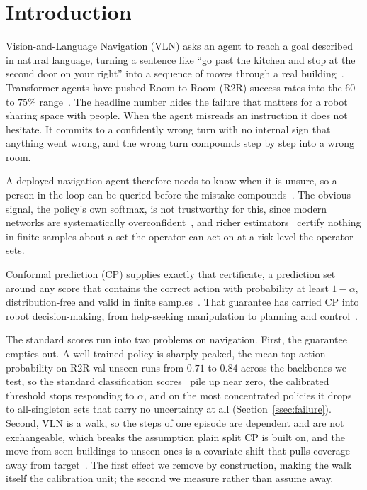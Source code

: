 \section{Introduction}
\label{sec:intro}

Vision-and-Language Navigation (VLN) asks an agent to reach a goal described in
natural language, turning a sentence like ``go past the kitchen and stop at the
second door on your right'' into a sequence of moves through a real
building~\cite{anderson2018r2r}. Transformer agents have pushed Room-to-Room
(R2R) success rates into the $60$ to $75\%$
range~\cite{chen2022duet,chen2021hamt,hong2021vlnbert,zhang2024survey}. The
headline number
hides the failure that matters for a robot sharing space with people. When the
agent misreads an instruction it does not hesitate. It commits to a confidently
wrong turn with no internal sign that anything went wrong, and the wrong turn
compounds step by step into a wrong room.

A deployed navigation agent therefore needs to know when it is unsure, so a
person in the loop can be queried before the mistake
compounds~\cite{abraham2025ask,ren2023knowno}. The obvious signal, the policy's own softmax, is not trustworthy for this,
since modern networks are systematically
overconfident~\cite{guo2017calibration}, and richer
estimators~\cite{gal2016dropout,lakshminarayanan2017ensembles,geifman2017selective,thrun2005probabilistic}
certify nothing in finite samples
about a set the operator can act on at a risk level the operator sets.

Conformal prediction (CP) supplies exactly that certificate, a prediction set
around any score that contains the correct action with probability at least
$1-\alpha$, distribution-free and valid in finite
samples~\cite{vovk2005alrw,angelopoulos2023gentle}. That guarantee has
carried CP into robot decision-making, from help-seeking manipulation to
planning and
control~\cite{ren2023knowno,liang2024introspective,lindemann2023conformal,dixit2023multiagent}.

The standard scores run into two problems on navigation. First, the guarantee
empties out. A well-trained policy is sharply peaked, the mean top-action
probability on R2R val-unseen runs from $0.71$ to $0.84$ across the backbones
we test, so the standard classification
scores~\cite{sadinle2019least,romano2020aps,angelopoulos2021raps} pile up near
zero, the calibrated threshold stops responding to $\alpha$, and on the most
concentrated policies it drops to all-singleton sets that carry no uncertainty
at all (Section~\ref{ssec:failure}). Second, VLN is a walk, so the steps of
one episode are dependent and are not exchangeable, which breaks the
assumption plain split CP is built on, and the move from seen buildings to
unseen ones is a covariate shift that pulls coverage away from
target~\cite{tibshirani2019covariateshift,barber2023beyond}. The first effect
we remove by construction, making the walk itself the calibration unit; the
second we measure rather than assume away.

